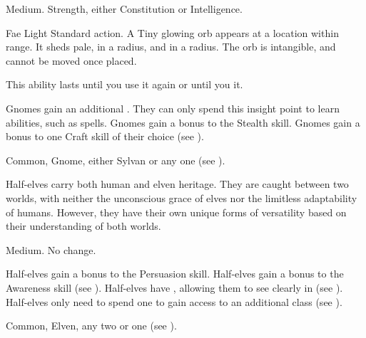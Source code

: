    Medium.
    Strength, either  Constitution or  Intelligence.
  \begin{raggeditemize}
    \begin{activeability}{Fae Light}
      \abilityusagetime Standard action.
      \rankline
      A Tiny glowing orb appears at a location within \rngmed range.
      It sheds pale,  in a \areasmall radius, and  in a \areamed radius.
      The orb is intangible, and cannot be moved once placed.

      This ability lasts until you use it again or until you  it.
    \end{activeability}
     Gnomes gain an additional .
      They can only spend this insight point to learn \magical abilities, such as spells.
     Gnomes gain a  bonus to the Stealth skill.
     Gnomes gain a  bonus to one Craft skill of their choice (see ).
  \end{raggeditemize}
   Common, Gnome, either Sylvan or any one  (see ).


  Half-elves carry both human and elven heritage.
  They are caught between two worlds, with neither the unconscious grace of elves nor the limitless adaptability of humans.
  However, they have their own unique forms of versatility based on their understanding of both worlds.

   Medium.
   No change.
  \begin{raggeditemize}
     Half-elves gain a  bonus to the Persuasion skill.
     Half-elves gain a  bonus to the Awareness skill (see ).
     Half-elves have , allowing them to see clearly in  (see ).
     Half-elves only need to spend one  to gain access to an additional class (see ).
  \end{raggeditemize}
   Common, Elven, any two  or one  (see ).

